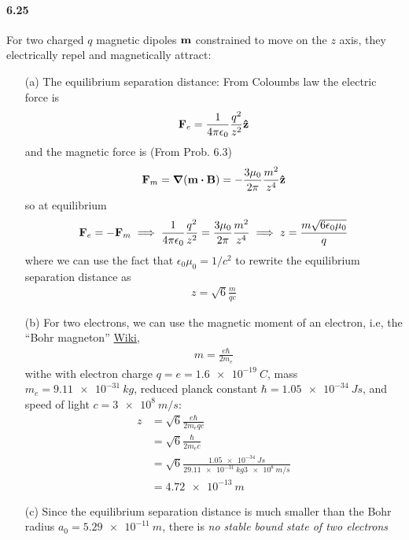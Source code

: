 \documentclass[../main.tex]{subfiles}
\begin{document}
\paragraph{6.25} For two charged $q$ magnetic dipoles $\vb m$ constrained to move on the
$z$ axis, they electrically repel and magnetically attract:
\begin{itemize}
    \item [(a)] The equilibrium separation distance: From Coloumbs law the electric force is
    \begin{align*}
        \vb F_e = \frac{1}{4\pi\epsilon_0} \frac{q^2}{z^2} \vu z
    \end{align*}
    and the magnetic force is (From Prob. 6.3)
    \begin{align*}
        \vb F_m = \grad(\vb m \vdot \vb B) = - \frac{3\mu_0}{2\pi} \frac{m^2}{z^4} \vu z
    \end{align*}
    so at equilibrium
    \begin{align*}
        \vb F_e = -\vb F_m \implies \frac{1}{4\pi\epsilon_0} \frac{q^2}{z^2} = \frac{3\mu_0}{2\pi} \frac{m^2}{z^4} \implies z = \frac{m\sqrt{6\epsilon_0 \mu_0}}{q}
    \end{align*}
    where we can use the fact that $\epsilon_0 \mu_0 = 1 / c^2$ to rewrite the equilibrium separation distance as
    \begin{align*}
        \boxed{z = \sqrt{6} \frac{m}{qc}}
    \end{align*}
    \item [(b)] For two electrons, we can use the magnetic moment of an electron, i.e, the ``Bohr magneton'' \href{https://en.wikipedia.org/wiki/Bohr_magneton}{Wiki},
    \begin{align*}
        m = \frac{e \hbar}{2m_e}
    \end{align*}
    withe with electron charge $q = e = \qty{1.6e-19}{C}$, mass $m_e = \qty{9.11e-31}{kg}$, reduced planck constant $\hbar = \qty{1.05e-34}{J s}$, and speed of light $c = \qty{3e8}{m/s}$:
    \begin{align*}
        z &= \sqrt{6} \frac{e\hbar}{2m_e q c} \\
        &= \sqrt{6} \frac{\hbar}{2m_e c} \\
        &= \sqrt{6} \frac{\qty{1.05e-34}{J s}}{2 \qty{9.11e-31}{kg} \qty{3e8}{m/s}} \\
        &= \qty{4.72e-13}{m}
    \end{align*}
    \item [(c)] Since the equilibrium separation distance is much smaller than the Bohr radius $a_0 = \qty{5.29e-11}{m}$,
    there is \emph{no stable bound state of two electrons}
\end{itemize}
\end{document}
